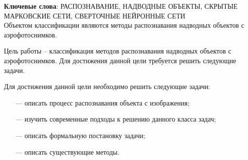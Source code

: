 \begin{essay}{}
    \noindent\textbf{Ключевые слова}: РАСПОЗНАВАНИЕ, НАДВОДНЫЕ ОБЪЕКТЫ, СКРЫТЫЕ МАРКОВСКИЕ СЕТИ, СВЕРТОЧНЫЕ НЕЙРОННЫЕ СЕТИ\\
    
    Объектом классификации являются методы распознавания надводных объектов с аэрофотоснимков.
    
    Цель работы -- классификация методов распознавания надводных объектов с аэрофотоснимков. Для достижения данной цели требуется решить следующие задачи.
    
    Для достижения данной цели необходимо решить следующие задачи:
    \begin{itemize}
        \item[---] описать процесс распознавания объекта с изображения;
        \item[---] изучить современные подходы к решению данного класса задач;
        \item[---] описать формальную постановку задачи;
        \item[---] описать существующие методы.
    \end{itemize}

\end{essay}